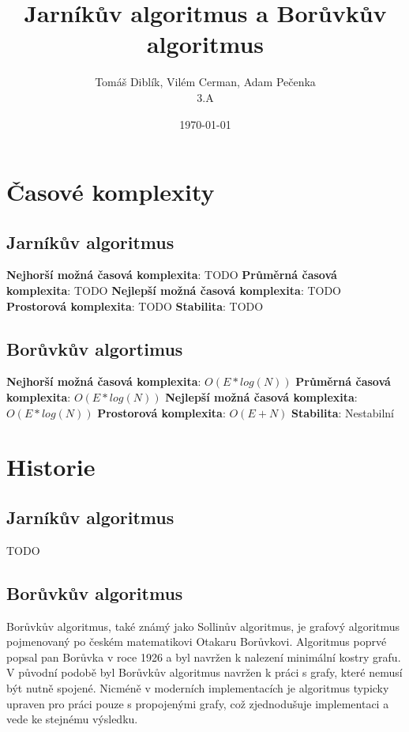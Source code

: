 \documentclass[11pt]{article}
\author{Tomáš Diblík, Vilém Cerman, Adam Pečenka \\ 3.A}
\title{Jarníkův algoritmus a Borůvkův algoritmus}
\date{\selectlanguage{czech}\today}
\begin{document}
\maketitle
\thispagestyle{empty}
\pagebreak

\tableofcontents
\thispagestyle{empty}
\pagebreak

\setcounter{page}{1}
\section{Časové komplexity}

\subsection{Jarníkův algoritmus}

\medbreak
\textbf{Nejhorší možná časová komplexita}: TODO
\medbreak\noindent
\textbf{Průměrná časová komplexita}: TODO
\medbreak\noindent
\textbf{Nejlepší možná časová komplexita}: TODO
\medbreak\noindent
\textbf{Prostorová komplexita}: TODO
\medbreak\noindent
\textbf{Stabilita}: TODO
\medbreak

\subsection{Borůvkův algortimus}

\medbreak
\textbf{Nejhorší možná časová komplexita}: $O(E * log(N))$
\medbreak\noindent
\textbf{Průměrná časová komplexita}: $O(E * log(N))$
\medbreak\noindent
\textbf{Nejlepší možná časová komplexita}: $O(E * log(N))$
\medbreak\noindent
\textbf{Prostorová komplexita}: $O(E + N)$
\medbreak\noindent
\textbf{Stabilita}: Nestabilní
\medbreak

\pagebreak


\section{Historie}

\subsection{Jarníkův algoritmus}
TODO

\subsection{Borůvkův algoritmus}
Borůvkův algoritmus, také známý jako Sollinův algoritmus, je grafový algoritmus pojmenovaný po 
českém matematikovi Otakaru Borůvkovi. Algoritmus poprvé popsal pan Borůvka v roce 1926 a byl 
navržen k nalezení minimální kostry grafu. 
V původní podobě byl Borůvkův algoritmus navržen k práci s grafy, které nemusí být nutně spojené. 
Nicméně v moderních implementacích je algoritmus typicky upraven pro práci pouze s 
propojenými grafy, což zjednodušuje implementaci a vede ke stejnému výsledku.
\end{document}
